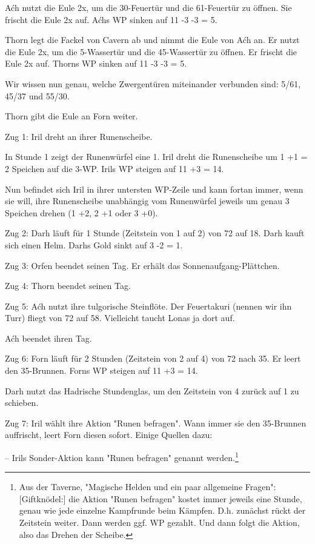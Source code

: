 \documentclass[10pt, a4paper, oneside]{book}
\begin{document}
{Aćh nutzt die Eule 2x, um die 30-Feuertür und die 61-Feuertür zu öffnen. Sie frischt die Eule 2x auf. Aćhs WP sinken auf 11 -3 -3 = 5.

Thorn legt die Fackel von Cavern ab und nimmt die Eule von Aćh an. Er nutzt die Eule 2x, um die 5-Wassertür und die 45-Wassertür zu öffnen. Er frischt die Eule 2x auf. Thorns WP sinken auf 11 -3 -3 = 5.

Wir wissen nun genau, welche Zwergentüren miteinander verbunden sind: 5/61, 45/37 und 55/30.

Thorn gibt die Eule an Forn weiter.



Zug 1: Iril dreht an ihrer Runenscheibe.

In Stunde 1 zeigt der Runenwürfel eine 1. Iril dreht die Runenscheibe um 1 +1 = 2 Speichen auf die 3-WP. Irils WP steigen auf 11 +3 = 14.

Nun befindet sich Iril in ihrer untersten WP-Zeile und kann fortan immer, wenn sie will, ihre Runenscheibe unabhängig vom Runenwürfel jeweils um genau 3 Speichen drehen (1 +2, 2 +1 oder 3 +0).



Zug 2: Darh läuft für 1 Stunde (Zeitstein von 1 auf 2) von 72 auf 18. Darh kauft sich einen Helm. Darhs Gold sinkt auf 3 -2 = 1.



Zug 3: Orfen beendet seinen Tag. Er erhält das Sonnenaufgang-Plättchen.



Zug 4: Thorn beendet seinen Tag.



Zug 5: Aćh nutzt ihre tulgorische Steinflöte. Der Feuertakuri (nennen wir ihn Turr) fliegt von 72 auf 58. Vielleicht taucht Lonas ja dort auf.

Aćh beendet ihren Tag.



Zug 6: Forn läuft für 2 Stunden (Zeitstein von 2 auf 4) von 72 nach 35. Er leert den 35-Brunnen. Forns WP steigen auf 11 +3 = 14.

Darh nutzt das Hadrische Stundenglas, um den Zeitstein von 4 zurück auf 1 zu schieben.



Zug 7: Iril wählt ihre Aktion "Runen befragen". Wann immer sie den 35-Brunnen auffrischt, leert Forn diesen sofort. Einige Quellen dazu:

– Irils Sonder-Aktion kann "Runen befragen" genannt werden.\footnote{Aus der Taverne, "Magische Helden und ein paar allgemeine Fragen": [Giftknödel:] die Aktion "Runen befragen" kostet immer jeweils eine Stunde, genau wie jede einzelne Kampfrunde beim Kämpfen. D.h. zunächst rückt der Zeitstein weiter. Dann werden ggf. WP gezahlt. Und dann folgt die Aktion, also das Drehen der Scheibe.}

}
\end{document}
